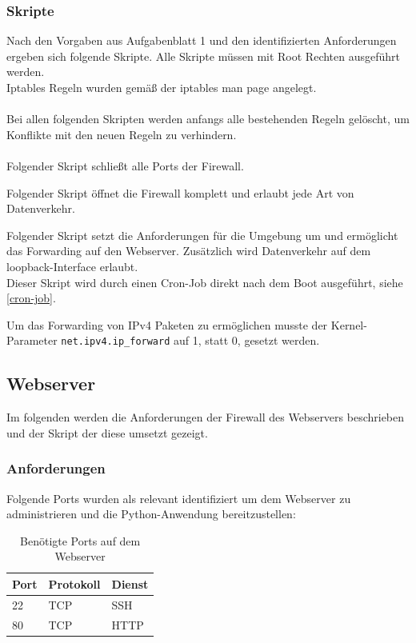 \documentclass[
    a4paper,
    pagesize,
	pdftex,
    12pt,
]{scrartcl}
\begin{document}
\subsubsection{Skripte}
Nach den Vorgaben aus Aufgabenblatt 1 und den identifizierten Anforderungen ergeben sich folgende Skripte. Alle Skripte müssen mit  Root Rechten ausgeführt werden.\\
Iptables Regeln wurden gemäß der iptables man page \cite{iptables-manpage} angelegt. \\ \\ 
Bei allen folgenden Skripten werden anfangs alle bestehenden Regeln gelöscht, um Konflikte mit den neuen Regeln zu verhindern. \\ \\
Folgender Skript schließt alle Ports der Firewall.

Folgender Skript öffnet die Firewall komplett und erlaubt jede Art von Datenverkehr.

Folgender  Skript setzt die Anforderungen für die Umgebung um und ermöglicht das Forwarding auf den Webserver. Zusätzlich  wird  Datenverkehr auf dem  loopback-Interface erlaubt. \\
Dieser Skript wird durch einen Cron-Job direkt nach dem Boot ausgeführt, siehe  \ref{cron-job}.

Um das Forwarding von IPv4 Paketen zu ermöglichen musste der Kernel-Parameter \lstinline[breaklines]|net.ipv4.ip_forward| auf 1, statt 0, gesetzt werden. \cite{ipv4forward-kernel}

\subsection{Webserver}\label{config-firewall-ws}
Im folgenden werden die Anforderungen der Firewall des Webservers beschrieben und der Skript der diese umsetzt gezeigt.

\subsubsection{Anforderungen}
Folgende Ports wurden als relevant identifiziert um dem Webserver zu administrieren und die Python-Anwendung bereitzustellen:
\begin{table}[h!]
	\begin{center}
		\label{tab:table4}
		\begin{tabular}{l|l |l }
			\textbf{Port} & \textbf{Protokoll} & \textbf{Dienst} \\
			\hline
			22 & TCP & SSH \\
			80 & TCP & HTTP \\
		\end{tabular}
		\caption{Benötigte Ports auf dem Webserver}
	\end{center}
\end{table}
\end{document}
